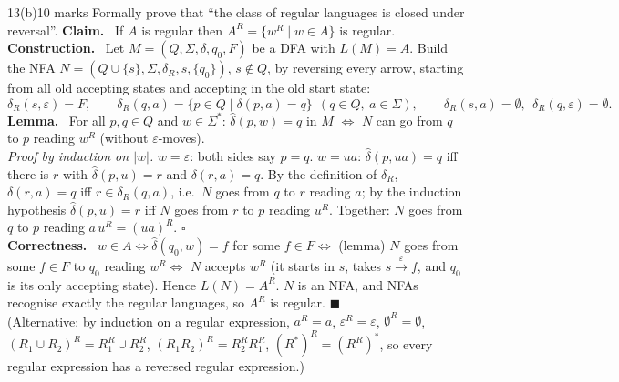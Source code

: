 \documentclass[10.5pt,a4paper]{article}
\newcommand{\ansh}[1]{\textbf{\color{exborder}#1}\ }
\newcommand{\eps}{\varepsilon}
\begin{document}
\begin{qa}{13(b)}{10 marks}
Formally prove that ``the class of regular languages is closed under reversal''.
\tcblower
\ansh{Claim.} If $A$ is regular then $A^R=\{w^R\mid w\in A\}$ is regular.\\
\ansh{Construction.} Let $M=(Q,\Sigma,\delta,q_0,F)$ be a DFA with $L(M)=A$. Build the NFA $N=(Q\cup\{s\},\Sigma,\delta_R,s,\{q_0\})$, $s\notin Q$, by
reversing every arrow, starting from all old accepting states and accepting in the old start state:
\[\delta_R(s,\eps)=F,\qquad \delta_R(q,a)=\{p\in Q\mid \delta(p,a)=q\}\ \ (q\in Q,\ a\in\Sigma),\qquad \delta_R(s,a)=\emptyset,\ \ \delta_R(q,\eps)=\emptyset .\]
\ansh{Lemma.} For all $p,q\in Q$ and $w\in\Sigma^*$: $\hat\delta(p,w)=q$ in $M$ $\iff$ $N$ can go from $q$ to $p$ reading $w^R$ (without
$\eps$-moves).\\
\emph{Proof by induction on $|w|$.} $w=\eps$: both sides say $p=q$. $w=ua$: $\hat\delta(p,ua)=q$ iff there is $r$ with $\hat\delta(p,u)=r$ and
$\delta(r,a)=q$. By the definition of $\delta_R$, $\delta(r,a)=q$ iff $r\in\delta_R(q,a)$, i.e.\ $N$ goes from $q$ to $r$ reading $a$; by the
induction hypothesis $\hat\delta(p,u)=r$ iff $N$ goes from $r$ to $p$ reading $u^R$. Together: $N$ goes from $q$ to $p$ reading $a\,u^R=(ua)^R$. \hfill$\square$\\
\ansh{Correctness.}
$w\in A\iff\hat\delta(q_0,w)=f$ for some $f\in F\iff$ (lemma) $N$ goes from some $f\in F$ to $q_0$ reading $w^R\iff$ $N$ accepts $w^R$ (it starts
in $s$, takes $s\xrightarrow{\eps}f$, and $q_0$ is its only accepting state). Hence $L(N)=A^R$. $N$ is an NFA, and NFAs recognise exactly the
regular languages, so $A^R$ is regular. $\blacksquare$\\
(Alternative: by induction on a regular expression, $a^R=a$, $\eps^R=\eps$, $\emptyset^R=\emptyset$, $(R_1\cup R_2)^R=R_1^R\cup R_2^R$,
$(R_1R_2)^R=R_2^RR_1^R$, $(R^*)^R=(R^R)^*$, so every regular expression has a reversed regular expression.)
\end{qa}
\end{document}
